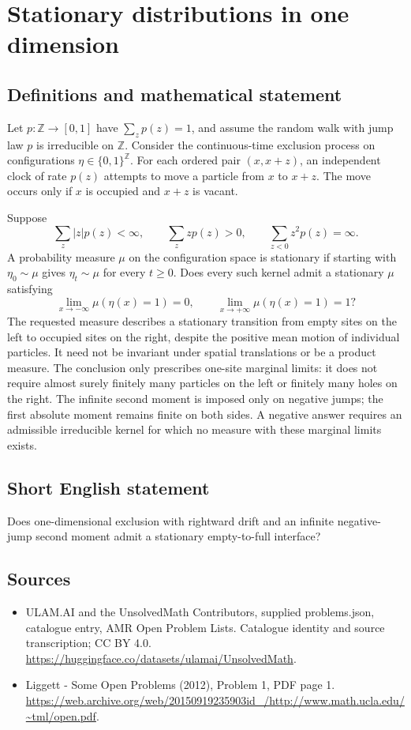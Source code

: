 \documentclass[11pt,a4paper]{article}
\begin{document}
\section*{Stationary distributions in one dimension}\label{statement}

\subsection{Definitions and mathematical statement}
Let $p:\mathbb Z\to[0,1]$ have $\sum_zp(z)=1$, and assume the random walk with jump law $p$ is irreducible on $\mathbb Z$. Consider the continuous-time exclusion process on configurations $\eta\in\{0,1\}^{\mathbb Z}$. For each ordered pair $(x,x+z)$, an independent clock of rate $p(z)$ attempts to move a particle from $x$ to $x+z$. The move occurs only if $x$ is occupied and $x+z$ is vacant.

Suppose
\[
\sum_z|z|p(z)<\infty,\qquad
\sum_z z p(z)>0,\qquad
\sum_{z<0}z^2p(z)=\infty.
\]
A probability measure $\mu$ on the configuration space is stationary if starting with $\eta_0\sim\mu$ gives $\eta_t\sim\mu$ for every $t\ge0$. Does every such kernel admit a stationary $\mu$ satisfying
\[
\lim_{x\to-\infty}\mu(\eta(x)=1)=0,
\qquad \lim_{x\to+\infty}\mu(\eta(x)=1)=1?
\]
The requested measure describes a stationary transition from empty sites on the left to occupied sites on the right, despite the positive mean motion of individual particles. It need not be invariant under spatial translations or be a product measure. The conclusion only prescribes one-site marginal limits: it does not require almost surely finitely many particles on the left or finitely many holes on the right. The infinite second moment is imposed only on negative jumps; the first absolute moment remains finite on both sides. A negative answer requires an admissible irreducible kernel for which no measure with these marginal limits exists.
\subsection{Short English statement}
Does one-dimensional exclusion with rightward drift and an infinite negative-jump second moment admit a stationary empty-to-full interface?
\subsection{Sources}
\begin{itemize}
\item[S1] ULAM.AI and the UnsolvedMath Contributors, supplied problems.json, catalogue entry, AMR Open Problem Lists. Catalogue identity and source transcription; CC BY 4.0.
\url{https://huggingface.co/datasets/ulamai/UnsolvedMath}.
\item[S2] Liggett - Some Open Problems (2012), Problem 1, PDF page 1. 
\url{https://web.archive.org/web/20150919235903id_/http://www.math.ucla.edu/~tml/open.pdf}.
\end{itemize}
\end{document}
